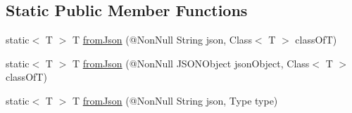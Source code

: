 \subsection*{Static Public Member Functions}
\begin{DoxyCompactItemize}
\item 
static$<$ T $>$ T \hyperlink{classcom_1_1toast_1_1android_1_1gamebase_1_1base_1_1_value_object_ae6655c88c20a9a8406dc11b46250ac7b}{from\+Json} (@Non\+Null String json, Class$<$ T $>$ class\+OfT)
\item 
static$<$ T $>$ T \hyperlink{classcom_1_1toast_1_1android_1_1gamebase_1_1base_1_1_value_object_ab83c4196ee2e3f11553bbe0f04dc2101}{from\+Json} (@Non\+Null J\+S\+O\+N\+Object json\+Object, Class$<$ T $>$ class\+OfT)
\item 
static$<$ T $>$ T \hyperlink{classcom_1_1toast_1_1android_1_1gamebase_1_1base_1_1_value_object_aa901d97d495150b54bcb80c05672f58a}{from\+Json} (@Non\+Null String json, Type type)
\end{DoxyCompactItemize}
